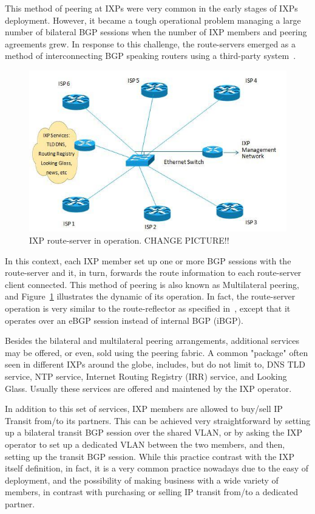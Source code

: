\documentclass[12pt]{article}
\begin{document}
This method of peering at IXPs were very common in the early stages of IXPs deployment. However, it became a tough operational problem managing a large number of bilateral BGP sessions when the number of IXP members and peering agreements grew. In response to this challenge, the route-servers emerged as a method of interconnecting BGP speaking routers using a third-party system~\cite{rfc7947}. 

\begin{figure}
\centering
\includegraphics[scale=0.4]{imagens/route-server.jpg} 
\caption{IXP route-server in operation. CHANGE PICTURE!!}
\label{fig:routeserver}
\end{figure}

In this context, each IXP member set up one or more BGP sessions with the route-server and it, in turn, forwards the route information to each route-server client connected. This method of peering is also known as Multilateral peering, and Figure~\ref{fig:routeserver} illustrates the dynamic of its operation. In fact, the route-server operation is very similar to the route-reflector as specified in~\cite{rfc4456}, except that it operates over an eBGP session instead of internal BGP (iBGP).

Besides the bilateral and multilateral peering arrangements, additional services may be offered, or even, sold using the peering fabric. A common "package" often seen in different IXPs around the globe, includes, but do not limit to, DNS TLD service, NTP service, Internet Routing Registry (IRR) service, and Looking Glass. Usually these services are offered and maintened by the IXP operator.

In addition to this set of services, IXP members are allowed to buy/sell IP Transit from/to its partners. This can be achieved very straightforward by setting up a bilateral transit BGP session over the shared VLAN, or by asking the IXP operator to set up a dedicated VLAN between the two members, and then, setting up the transit BGP session. While this practice contrast with the IXP itself definition, in fact, it is a very common practice nowadays due to the easy of deployment, and the possibility of making business with a wide variety of members, in contrast with purchasing or selling IP transit from/to a dedicated partner. 
\end{document}
